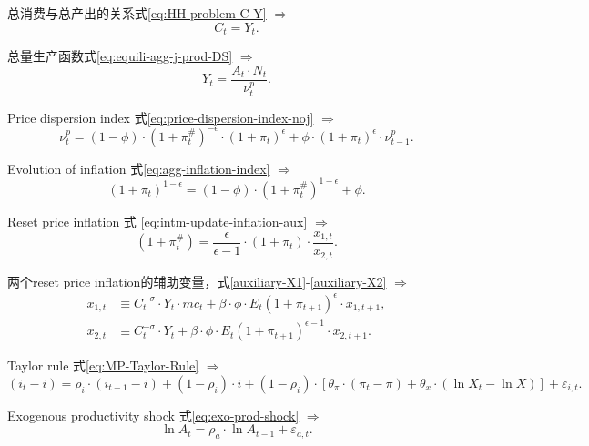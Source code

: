 总消费与总产出的关系式\eqref{eq:HH-problem-C-Y} $\Rightarrow$
\begin{equation*}
  C_t = Y_t.
\end{equation*}

总量生产函数式\eqref{eq:equili-agg-j-prod-DS} $\Rightarrow$
\begin{equation*}
  Y_t = \frac{A_t \cdot N_t}{\nu^p_t}.
\end{equation*}

Price dispersion index 式\eqref{eq:price-dispersion-index-noj} $\Rightarrow$
\begin{equation*}
  \nu^p_t = (1-\phi) \cdot (1+\pi^{\#}_t)^{-\epsilon} \cdot (1+\pi_t)^{\epsilon} + \phi \cdot (1+\pi_t)^{\epsilon} \cdot \nu^p_{t-1}.
\end{equation*}

Evolution of inflation 式\eqref{eq:agg-inflation-index} $\Rightarrow$
\begin{equation*}
    \left(1+\pi_t\right)^{1-\epsilon} = (1-\phi) \cdot \left(1+\pi^{\#}_t\right)^{1-\epsilon} + \phi.
\end{equation*}

Reset price inflation 式  \eqref{eq:intm-update-inflation-aux} $\Rightarrow$
\begin{equation*}
  (1+\pi^{\#}_t) = \frac{\epsilon}{\epsilon -1} \cdot \left( 1+\pi_t \right) \cdot \frac{x_{1,t}}{x_{2,t}}.
\end{equation*}

两个reset price inflation的辅助变量，式\eqref{auxiliary-X1}-\eqref{auxiliary-X2} $\Rightarrow$
\begin{align*}
  x_{1,t} &\equiv C_t^{-\sigma} \cdot Y_t \cdot mc_t + \beta \cdot \phi \cdot E_t \left(1+\pi_{t+1} \right)^{\epsilon} \cdot x_{1,t+1},\\
  x_{2,t} &\equiv C_t^{-\sigma} \cdot Y_t + \beta \cdot \phi \cdot E_t \left( 1+\pi_{t+1} \right)^{\epsilon -1} \cdot x_{2,t+1}.
\end{align*}

Taylor rule 式\eqref{eq:MP-Taylor-Rule} $\Rightarrow$
\begin{equation*}
  (i_t-i) = \rho_i \cdot (i_{t-1}-i) + (1-\rho_i) \cdot i+ (1-\rho_i) \cdot \left[
    \theta_{\pi} \cdot (\pi_t - \pi) + \theta_{x} \cdot (\ln X_t - \ln X)
  \right] + \varepsilon_{i,t}.
\end{equation*}

Exogenous productivity shock 式\eqref{eq:exo-prod-shock} $\Rightarrow$
\begin{equation*}
  \ln A_t = \rho_a \cdot \ln A_{t-1} + \varepsilon_{a,t} .
\end{equation*}

